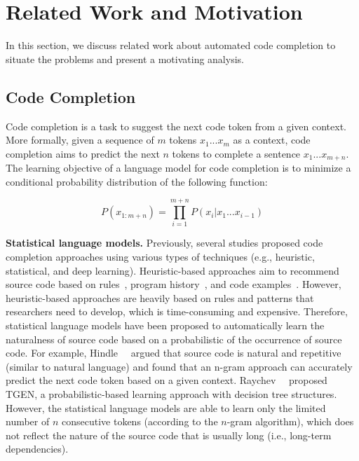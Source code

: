 \section{Related Work and Motivation}\label{sec:background} 


In this section, we discuss related work about automated code completion to situate the problems and present a motivating analysis.  

\subsection{Code Completion}
Code completion is a task to suggest the next code token from a given context. More formally, given a sequence of $m$ tokens $x_1 ... x_m$ as a context, code completion aims to predict the next $n$ tokens to complete a sentence $x_1 ... x_{m+n}$. 
The learning objective of a language model for code completion is to minimize a conditional probability distribution of the following function:

\[ P(x_{1:m+n}) = \prod_{i=1}^{m+n} P(x_i|x_1 ... x_{i-1}) \]


\textbf{Statistical language models.} Previously, several studies proposed code completion approaches using various types of techniques (e.g., heuristic, statistical, and deep learning).
Heuristic-based approaches aim to recommend source code based on rules~\cite{hou2010towards}, program history~\cite{robbes2008program}, and code examples~\cite{bruch2009learning}.
However, heuristic-based approaches are heavily based on rules and patterns that researchers need to develop, which is time-consuming and expensive.
Therefore, statistical language models have been proposed to automatically learn the naturalness of source code based on a probabilistic of the occurrence of source code.
For example, Hindle~\ea~\cite{10.5555/2337223.2337322, hindle2016naturalness} argued that source code is natural and repetitive (similar to natural language) and found that an n-gram approach can accurately predict the next code token based on a given context.
Raychev~\ea~\cite{raychev2016probabilistic} proposed TGEN, a probabilistic-based learning approach with decision tree structures.
However, the statistical language models are able to learn only the limited number of $n$ consecutive tokens (according to the $n$-gram algorithm), which does not reflect the nature of the source code that is usually long (i.e., long-term dependencies).



